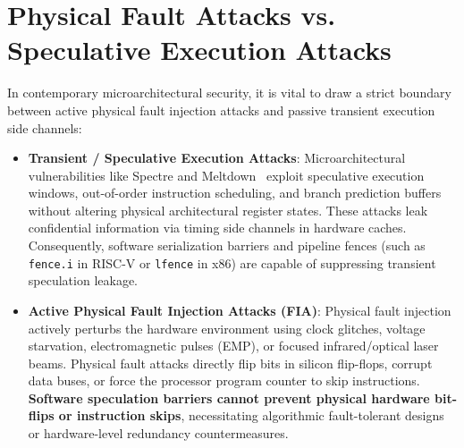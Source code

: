 \section{Physical Fault Attacks vs. Speculative Execution Attacks}
\label{sec:faults_vs_speculation}
In contemporary microarchitectural security, it is vital to draw a strict boundary between active physical fault injection attacks and passive transient execution side channels:
\begin{itemize}
    \item \textbf{Transient / Speculative Execution Attacks}: Microarchitectural vulnerabilities like Spectre and Meltdown~\cite{canella2020systematic} exploit speculative execution windows, out-of-order instruction scheduling, and branch prediction buffers without altering physical architectural register states. These attacks leak confidential information via timing side channels in hardware caches. Consequently, software serialization barriers and pipeline fences (such as \texttt{fence.i} in RISC-V or \texttt{lfence} in x86) are capable of suppressing transient speculation leakage.
    \item \textbf{Active Physical Fault Injection Attacks (FIA)}: Physical fault injection actively perturbs the hardware environment using clock glitches, voltage starvation, electromagnetic pulses (EMP), or focused infrared/optical laser beams. Physical fault attacks directly flip bits in silicon flip-flops, corrupt data buses, or force the processor program counter to skip instructions. \textbf{Software speculation barriers cannot prevent physical hardware bit-flips or instruction skips}, necessitating algorithmic fault-tolerant designs or hardware-level redundancy countermeasures.
\end{itemize}

